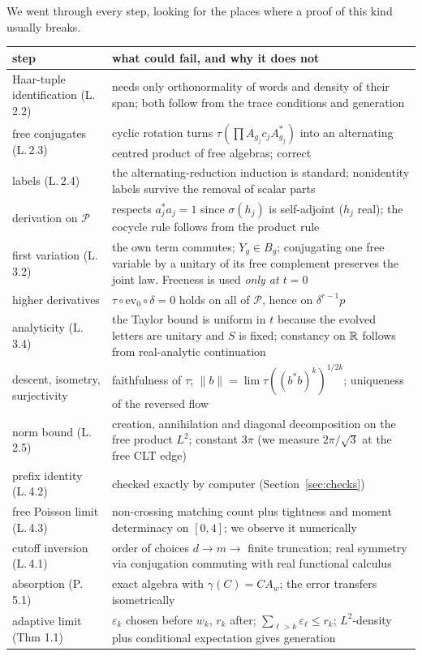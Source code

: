 \label{sec:critical}
We went through every step, looking for the places where a proof of this kind usually breaks.
\begin{center}\small
\begin{tabular}{>{\raggedright\arraybackslash}p{4.4cm}>{\raggedright\arraybackslash}p{9.6cm}}\toprule
step & what could fail, and why it does not\\\midrule
Haar-tuple identification (L.\,2.2) & needs only orthonormality of words and density of their span; both follow from the trace conditions and generation\\
free conjugates (L.\,2.3) & cyclic rotation turns $\tau(\prod A_{g_j}c_jA_{g_j}^*)$ into an alternating centred product of free algebras; correct\\
labels (L.\,2.4) & the alternating-reduction induction is standard; nonidentity labels survive the removal of scalar parts\\
derivation on $\mathcal P$ & respects $a_j^*a_j=1$ since $\sigma(h_j)$ is self-adjoint ($h_j$ real); the cocycle rule follows from the product rule\\
first variation (L.\,3.2) & the own term commutes; $Y_g\in B_g$; conjugating one free variable by a unitary of its free complement preserves the joint law. Freeness is
used \emph{only at $t=0$}\\
higher derivatives & $\tau\circ\mathrm{ev}_0\circ\delta=0$ holds on all of $\mathcal P$, hence on $\delta^{r-1}p$\\
analyticity (L.\,3.4) & the Taylor bound is uniform in $t$ because the evolved letters are unitary and $S$ is fixed; constancy on $\mathbb R$ follows from real-analytic
continuation\\
descent, isometry, surjectivity & faithfulness of $\tau$; $\|b\|=\lim\tau((b^*b)^k)^{1/2k}$; uniqueness of the reversed flow\\
norm bound (L.\,2.5) & creation, annihilation and diagonal decomposition on the free product $L^2$; constant $3\pi$ (we measure $2\pi/\sqrt3$ at the free CLT edge)\\
prefix identity (L.\,4.2) & checked exactly by computer (Section~\ref{sec:checks})\\
free Poisson limit (L.\,4.3) & non-crossing matching count plus tightness and moment determinacy on $[0,4]$; we observe it numerically\\
cutoff inversion (L.\,4.1) & order of choices $d\to m\to$ finite truncation; real symmetry via conjugation commuting with real functional calculus\\
absorption (P.\,5.1) & exact algebra with $\gamma(C)=CA_w$; the error transfers isometrically\\
adaptive limit (Thm 1.1) & $\varepsilon_k$ chosen before $w_k$, $r_k$ after; $\sum_{\ell>k}\varepsilon_\ell\le r_k$; $L^2$-density plus conditional expectation gives generation\\\bottomrule
\end{tabular}
\end{center}
